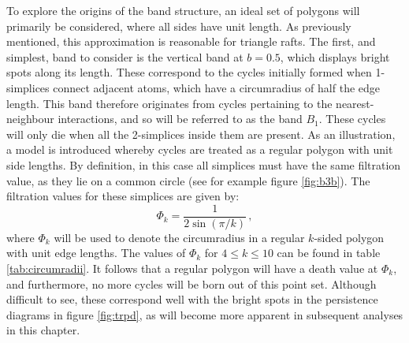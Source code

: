 To explore the origins of the band structure, an ideal set of polygons will primarily be considered, where all sides have unit length.
As previously mentioned, this approximation is reasonable for triangle rafts.
The first, and simplest, band to consider is the vertical band at $b=0.5$, which displays bright spots along its length.
These correspond to the cycles initially formed when 1\--simplices connect adjacent atoms, which have a circumradius of half the edge length.
This band therefore originates from cycles pertaining to the nearest\--neighbour interactions, and so will be referred to as the band $B_1$.
These cycles will only die when all the 2\--simplices inside them are present.
As an illustration, a model is introduced whereby cycles are treated as a regular polygon with unit side lengths.
By definition, in this case all simplices must have the same filtration value, as they lie on a common circle (see for example figure \ref{fig:b3b}).
The filtration values for these simplices are given by:
\begin{equation}
	\Phi_k = \frac{1}{2\sin\left(\pi/k\right)}\,,
\end{equation}
where $\Phi_k$ will be used to denote the circumradius in a regular $k$\--sided polygon with unit edge lengths.
The values of $\Phi_k$ for $4\leq k \leq 10$ can be found in table \ref{tab:circumradii}.
It follows that a regular polygon will have a death value at $\Phi_k$, and furthermore, no more cycles will be born out of this point set.
Although difficult to see, these correspond well with the bright spots in the persistence diagrams in figure \ref{fig:trpd}, as will become more apparent in subsequent analyses in this chapter.

